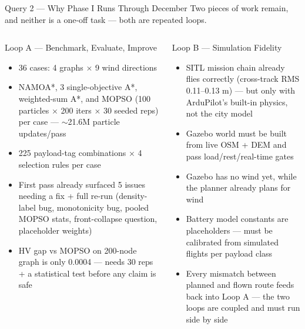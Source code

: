 \documentclass[aspectratio=169,11pt]{beamer}
\newcommand{\compactblocks}{\setbeamerfont{block title}{size=\small}}
\begin{document}
\begin{frame}{Query 2 --- Why Phase I Runs Through December}
  \compactblocks
  \scriptsize
  {\footnotesize Two pieces of work remain, and neither is a one-off task --- both are repeated loops.}
  \vspace{1mm}

  \begin{columns}[T,onlytextwidth]
      \begin{block}{Loop A --- Benchmark, Evaluate, Improve}
        \begin{itemize}
          \item 36 cases: 4 graphs $\times$ 9 wind directions
          \item NAMOA*, 3 single-objective A*, weighted-sum A*, and MOPSO (100 particles $\times$ 200 iters $\times$ 30 seeded reps) per case --- $\sim$21.6M particle updates/pass
          \item 225 payload-tag combinations $\times$ 4 selection rules per case
          \item First pass already surfaced 5 issues needing a fix + full re-run (density-label bug, monotonicity bug, pooled MOPSO stats, front-collapse question, placeholder weights)
          \item HV gap vs MOPSO on 200-node graph is only 0.0004 --- needs 30 reps + a statistical test before any claim is safe
        \end{itemize}
      \end{block}
      \begin{block}{Loop B --- Simulation Fidelity}
        \begin{itemize}
          \item SITL mission chain already flies correctly (cross-track RMS 0.11--0.13 m) --- but only with ArduPilot's built-in physics, not the city model
          \item Gazebo world must be built from live OSM + DEM and pass load/rest/real-time gates
          \item Gazebo has no wind yet, while the planner already plans for wind
          \item Battery model constants are placeholders --- must be calibrated from simulated flights per payload class
          \item Every mismatch between planned and flown route feeds back into Loop A --- the two loops are coupled and must run side by side
        \end{itemize}
      \end{block}
  \end{columns}
\end{frame}
\end{document}
